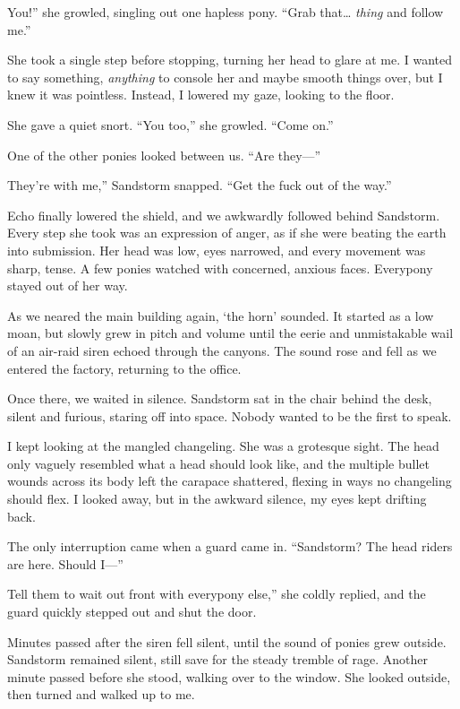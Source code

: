 \leavevmode{}You!” she growled, singling out one hapless pony. “Grab that… \textit{thing} and follow me.”

She took a single step before stopping, turning her head to glare at me. I wanted to say something, \textit{anything} to console her and maybe smooth things over, but I knew it was pointless. Instead, I lowered my gaze, looking to the floor.

She gave a quiet snort. “You too,” she growled. “Come on.”

One of the other ponies looked between us. “Are they—”

\leavevmode{}They’re with me,” Sandstorm snapped. “Get the fuck out of the way.”

Echo finally lowered the shield, and we awkwardly followed behind Sandstorm. Every step she took was an expression of anger, as if she were beating the earth into submission. Her head was low, eyes narrowed, and every movement was sharp, tense. A few ponies watched with concerned, anxious faces. Everypony stayed out of her way.

As we neared the main building again, ‘the horn’ sounded. It started as a low moan, but slowly grew in pitch and volume until the eerie and unmistakable wail of an air-raid siren echoed through the canyons. The sound rose and fell as we entered the factory, returning to the office.

Once there, we waited in silence. Sandstorm sat in the chair behind the desk, silent and furious, staring off into space. Nobody wanted to be the first to speak.

I kept looking at the mangled changeling. She was a grotesque sight. The head only vaguely resembled what a head should look like, and the multiple bullet wounds across its body left the carapace shattered, flexing in ways no changeling should flex. I looked away, but in the awkward silence, my eyes kept drifting back.

The only interruption came when a guard came in. “Sandstorm? The head riders are here. Should I—”

\leavevmode{}Tell them to wait out front with everypony else,” she coldly replied, and the guard quickly stepped out and shut the door.

Minutes passed after the siren fell silent, until the sound of ponies grew outside. Sandstorm remained silent, still save for the steady tremble of rage. Another minute passed before she stood, walking over to the window. She looked outside, then turned and walked up to me.

